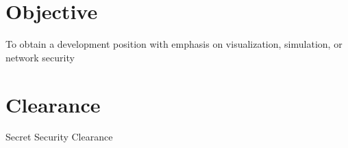 \documentclass[margin,line]{resume}
\begin{document}
\address{813 Troy Rd\\Edwardsville\\IL 62025 $\bullet$ (618) 530-0659 $\bullet$ jcook@siue.edu}
\begin{resume}
\section{Objective}
To obtain a development position with emphasis on visualization, simulation, or network security

\section{Clearance}
Secret Security Clearance


\end{resume}
\end{document}
